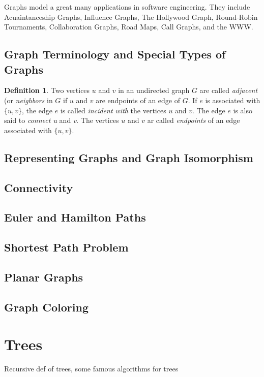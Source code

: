 \documentclass[11pt]{book} %
\theoremstyle {definition}
\newtheorem {definition}{Definition}[section]
\theoremstyle {remark}
\begin{document}
Graphs model a great many applications in software engineering. They include Acuaintanceship Graphs, Influence Graphs, The Hollywood Graph, Round-Robin Tournaments, Collaboration Graphs, Road Maps, Call Graphs, and the WWW.

\section {Graph Terminology and Special Types of Graphs}
\begin{definition}
Two vertices $u$ and $v$ in an undirected graph $G$ are called \textit{adjacent} (or \textit{neighbors} in $G$ if $u$ and $v$ are endpoints of an edge of $G$. If $e$ is associated with $\{u,v\}$, the edge $e$ is called \textit{incident with} the vertices $u$ and $v$. The edge $e$ is also said to \textit{connect u} and \textit{v}. The vertices $u$ and $v$ ar called \textit{endpoints} of an edge associated with $\{u,v\}$.
\end{definition}

\section {Representing Graphs and Graph Isomorphism}
\section {Connectivity}
\section {Euler and Hamilton Paths}
\section {Shortest Path Problem}
\section {Planar Graphs}
\section {Graph Coloring}

\newpage

\chapter {Trees}
Recursive def of trees, some famous algorithms for trees
\end{document}
